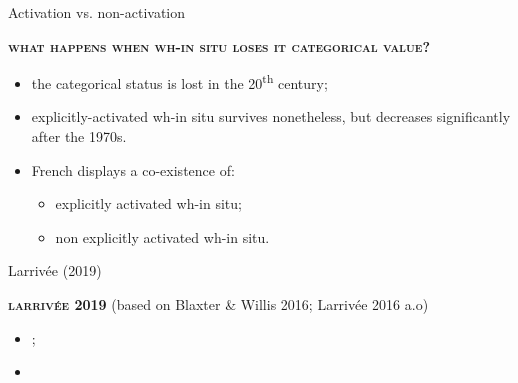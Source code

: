 \documentclass[lesson_slides]{subfiles}
\begin{document}
\begin{frame}[c]{Activation vs. non-activation}

    \noindent \textbf{\textsc{what happens when wh-in situ loses it categorical value?}}\\ \pause
    \begin{itemize}
        \item[\ding{227}] the categorical status is lost in the 20\textsuperscript{th} century; \pause
        \item[\ding{227}] explicitly-activated wh-in situ survives nonetheless, but decreases significantly after the 1970s. \pause
    \item[\ding{227}] French displays a co-existence of: \pause
    \begin{itemize}
        \item explicitly activated wh-in situ; \pause
        \item non explicitly activated wh-in situ.
    \end{itemize}
  \end{itemize}
\end{frame}
\begin{frame}[c]{Larrivée (2019)}

    \noindent \textbf{\textsc{larrivée 2019}} \pause (based on Blaxter & Willis 2016; Larrivée 2016 a.o) \pause
    \begin{itemize}
        \item[\ding{227}] ; \pause
        \item[\ding{227}] 
    \end{itemize}
  
\end{frame}
\end{document}
